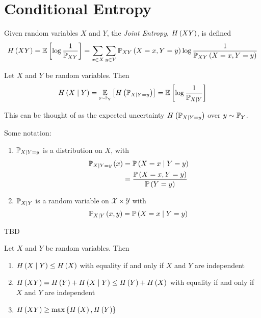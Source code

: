 \section{Conditional Entropy}
\begin{definition}
    Given random variables $X$ and $Y$, the \emph{Joint Entropy}, $H\left(XY\right)$,
    is defined
    \[\entropy{XY} = \expectation{\log\frac{1}{\Pr_{XY}}} = \sum_{x\in X}\sum_{y\in Y}\prob[XY]{X = x, Y = y}\log\frac{1}{\prob[XY]{X = x, Y = y}}\]
\end{definition}

\begin{definition}
    Let $X$ and $Y$ be random variables. Then
    \[\entropy{X \given Y} = \expectation[y \drawnfrom \Pr_Y]{\entropy{\Pr_{X \given Y = y}}} = \expectation{\log\frac{1}{\Pr_{X \given Y}}}\]
\end{definition}

This can be thought of as the expected uncertainty $H\left(\mathbb{P}_{X \mid Y = y}\right)$
over $y \sim \mathbb{P}_Y$.

\begin{definition}
    Some notation:
    \begin{enumerate}[label=(\arabic*)]
        \item $\mathbb{P}_{X \mid Y = y}$ is a distribution on $X$, with
              \begin{align*}\prob[X \given Y = y]{x}
                   & = \prob{X = x \given Y = y}                \\
                   & = \frac{\prob{X = x, Y = y}}{\prob{Y = y}}
              \end{align*}
        \item $\mathbb{P}_{X \mid Y}$ is a random variable on $\mathcal{X} \times \mathcal{Y}$ with
              \[\prob[X \given Y]{x, y} = \prob{X = x \given Y = y}\]
    \end{enumerate}
\end{definition}

\begin{example}
    TBD
\end{example}

\begin{theorem}
    Let $X$ and $Y$ be random variables. Then
    \begin{enumerate}[label=(\arabic*)]
        \item $H\left(X \mid Y\right) \leq H\left(X\right)$ with equality if and only if
              $X$ and $Y$ are independent
        \item $H\left(XY\right) = H\left(Y\right) + H\left(X \mid Y\right) \leq H\left(Y\right) + H\left(X\right)$
              with equality if and only if $X$ and $Y$ are independent
        \item $H\left(XY\right) \geq \max\left\lbrace H\left(X\right), H\left(Y\right)\right\rbrace$
    \end{enumerate}
\end{theorem}